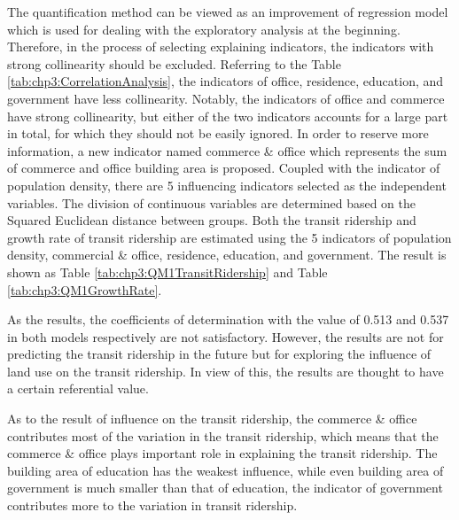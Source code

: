 %
The quantification method \uppercase\expandafter{} can be viewed as an improvement of regression model which is used for dealing with the exploratory analysis at the beginning. Therefore, in the process of selecting explaining indicators, the indicators with strong collinearity should be excluded. Referring to the Table \ref{tab:chp3:CorrelationAnalysis}, the indicators of office, residence, education, and government have less collinearity. Notably, the indicators of office and commerce have strong collinearity, but either of the two indicators accounts for a large part in total, for which they should not be easily ignored. In order to reserve more information, a new indicator named commerce \& office which represents the sum of commerce and office building area is proposed. Coupled with the indicator of population density, there are 5 influencing indicators selected as the independent variables. The division of continuous variables are determined based on the Squared Euclidean distance between groups. Both the transit ridership and growth rate of transit ridership are estimated using the 5 indicators of population density, commercial \& office, residence, education, and government. The result is shown as Table \ref{tab:chp3:QM1TransitRidership} and Table \ref{tab:chp3:QM1GrowthRate}.

%
As the results, the coefficients of determination with the value of 0.513 and 0.537 in both models respectively are not satisfactory. However, the results are not for predicting the transit ridership in the future but for exploring the influence of land use on the transit ridership. In view of this, the results are thought to have a certain referential value. 

%
As to the result of influence on the transit ridership, the commerce \& office contributes most of the variation in the transit ridership, which means that the commerce \& office plays important role in explaining the transit ridership. The building area of education has the weakest influence, while even building area of government is much smaller than that of education, the indicator of government contributes more to the variation in transit ridership. 

